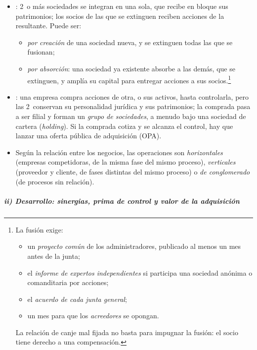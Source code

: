 \documentclass[11pt]{article}
\begin{document}
\begin{itemize}
\item {}: 2~o más sociedades se integran en una sola, que recibe en bloque sus patrimonios; los socios de las que se extinguen reciben acciones de la resultante\nocite{BOE2023RDL5}. Puede ser:
  \begin{itemize}
  \item \emph{por creación} de una sociedad nueva, y se extinguen todas las que se fusionan;
  \item \emph{por absorción}: una sociedad ya existente absorbe a las demás, que se extinguen, y amplía su capital para entregar acciones a sus socios.\footnote{La fusión exige:
\begin{itemize}
\item un \emph{proyecto común} de los administradores, publicado al menos un mes antes de la junta;
\item el \emph{informe de expertos independientes} si participa una sociedad anónima o comanditaria por acciones;
\item el \emph{acuerdo de cada junta general};
\item un mes para que los \emph{acreedores} se opongan.
\end{itemize}
La relación de canje mal fijada no basta para impugnar la fusión: el socio tiene derecho a una compensación\nocite{BOE2023RDL5}.}
  \end{itemize}
\item {}: una empresa compra acciones de otra, o sus activos, hasta controlarla, pero las 2~conservan su personalidad jurídica y sus patrimonios; la comprada pasa a ser filial y forman un \emph{grupo de sociedades}, a menudo bajo una sociedad de cartera (\emph{holding}). Si la comprada cotiza y se alcanza el control, hay que lanzar una oferta pública de adquisición (OPA).
\item Según la relación entre los negocios, las operaciones son \emph{horizontales} (empresas competidoras, de la misma fase del mismo proceso), \emph{verticales} (proveedor y cliente, de fases distintas del mismo proceso) o \emph{de conglomerado} (de procesos sin relación).
\end{itemize}

\subparagraph{ii) Desarrollo: sinergias, prima de control y valor de la adquisición}
\end{document}
